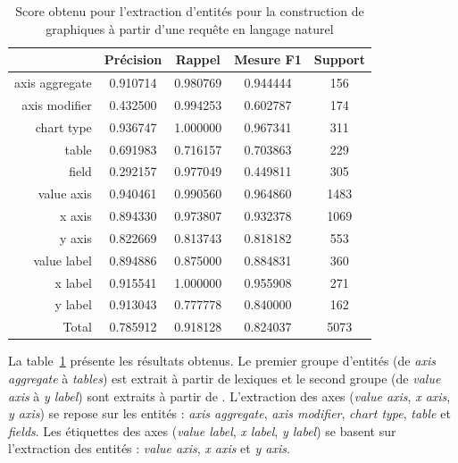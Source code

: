 \begin{table}[htb]
    \centering
    \begin{tabular}{r|cccc}
                       & Précision      & Rappel         & Mesure F1      & Support    \\
        \hline
        \hline
        axis aggregate & \num{0,910714} & \num{0,980769} & \num{0,944444} & \num{ 156} \\
        axis modifier  & \num{0,432500} & \num{0,994253} & \num{0,602787} & \num{ 174} \\
        chart type     & \num{0,936747} & \num{1,000000} & \num{0,967341} & \num{ 311} \\
        table          & \num{0,691983} & \num{0,716157} & \num{0,703863} & \num{ 229} \\
        field          & \num{0,292157} & \num{0,977049} & \num{0,449811} & \num{ 305} \\
        \hline
        value axis     & \num{0,940461} & \num{0,990560} & \num{0,964860} & \num{1483} \\
        x axis         & \num{0,894330} & \num{0,973807} & \num{0,932378} & \num{1069} \\
        y axis         & \num{0,822669} & \num{0,813743} & \num{0,818182} & \num{ 553} \\
        value label    & \num{0,894886} & \num{0,875000} & \num{0,884831} & \num{ 360} \\
        x label        & \num{0,915541} & \num{1.000000} & \num{0,955908} & \num{ 271} \\
        y label        & \num{0,913043} & \num{0,777778} & \num{0,840000} & \num{ 162} \\
        \hline
        Total          & \num{0,785912} & \num{0,918128} & \num{0,824037} & \num{5073}
    \end{tabular}
    \caption[Score obtenu pour l'extraction d'entités pour la construction de graphiques]{Score obtenu pour l'extraction d'entités pour la construction de graphiques à partir d'une requête en langage naturel}
    \label{tab:nl-query:result-dashboard}
\end{table}

La table~\ref{tab:nl-query:result-dashboard} présente les résultats obtenus.
Le premier groupe d'entités (de \emph{axis aggregate} à \emph{tables}) est extrait à partir de lexiques et le second groupe (de \emph{value axis} à \emph{y label}) sont extraits à partir de .
L'extraction des axes (\emph{value axis}, \emph{x axis}, \emph{y axis}) se repose sur les entités : \emph{axis aggregate}, \emph{axis modifier}, \emph{chart type}, \emph{table} et \emph{fields}.
Les étiquettes des axes (\emph{value label}, \emph{x label}, \emph{y label}) se basent sur l'extraction des entités : \emph{value axis}, \emph{x axis} et \emph{y axis}.

